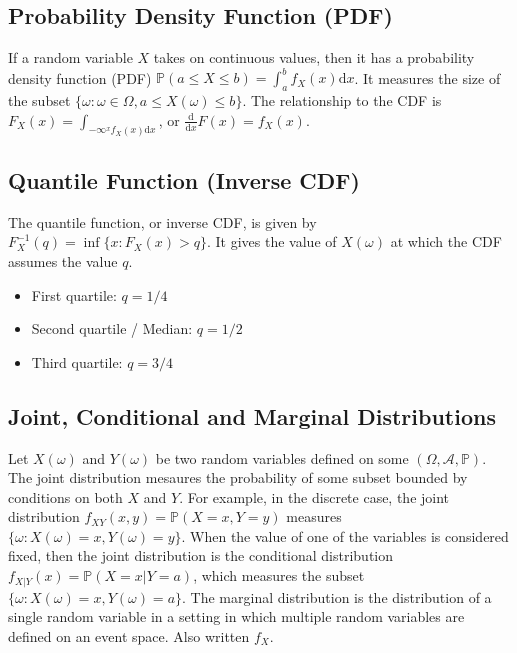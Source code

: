 \subsection{Probability Density Function (PDF)}
If a random variable $X$ takes on continuous values, then it has a probability density function (PDF) $\mathbb{P}(a\leq X \leq b) = \int_a^b f_X(x) \mathrm{d}x$. It measures the size of the subset $\{\omega: \omega\in\Omega, a\leq X(\omega) \leq b\}$. The relationship to the CDF is $F_X(x) = \int_{-\infty^x f_X(x) \mathrm{d}x}$, or $\frac{\mathrm{d}}{\mathrm{d}x}F(x) = f_X(x)$. 


\subsection{Quantile Function (Inverse CDF)}
The quantile function, or inverse CDF, is given by $F_X^{-1}(q) = \inf \{ x: F_X(x) > q \}$. It gives the value of $X(\omega)$ at which the CDF assumes the value $q$.

\begin{itemize}
\item First quartile: $q=1/4$
\item Second quartile / Median: $q =1/2$
\item Third quartile: $q=3/4$
\end{itemize}



\subsection{Joint, Conditional and Marginal Distributions}
Let $X(\omega)$ and $Y(\omega)$ be two random variables defined on some $(\Omega, \mathscr{A},\mathbb{P})$. The joint distribution mesaures the probability of some subset bounded by conditions on both $X$ and $Y$. For example, in the discrete case, the joint distribution $f_{XY}(x,y) = \mathbb{P}(X=x,Y=y)$ measures $\{\omega: X(\omega) = x, Y(\omega) = y\}$. When the value of one of the variables is considered fixed, then the joint distribution is the conditional distribution $f_{X|Y}(x) = \mathbb{P}(X=x|Y=a)$, which measures the subset $\{\omega: X(\omega) = x, Y(\omega) = a\}$. The marginal distribution is the distribution of a single random variable in a setting in which multiple random variables are defined on an event space. Also written $f_{X}$.


